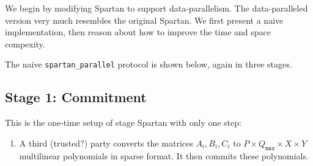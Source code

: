 \documentclass{article}
\newcommand{\red}[1] {\color{red}#1\color{black}}
\newcommand{\code}{\texttt}
\newcommand{\Qmax}{Q_{\mathtt{max}}}
\begin{document}
We begin by modifying Spartan to support data-parallelism. The data-paralleled version very much resembles the original Spartan. We first present a naive implementation, then reason about how to improve the time and space compexity.

The naive \code{spartan\_parallel} protocol is shown below, again in three stages.
\subsection{Stage 1: Commitment}\label{stage:commitment}
This is the one-time setup of stage Spartan with only one step:
\begin{enumerate}
    \item A third (\red{trusted?}) party converts the matrices $A_i, B_i, C_i$ to $P\times \Qmax \times X\times Y$ multilinear polynomials in sparse format. It then commits these polynomials.
\end{enumerate}
\end{document}
